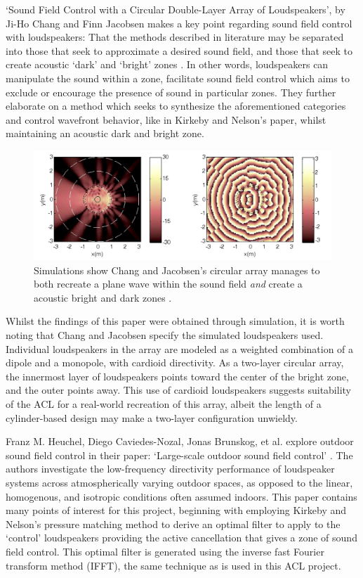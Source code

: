 \documentclass{report}
\begin{document}
        `Sound Field Control with a Circular Double-Layer Array of Loudspeakers', by Ji-Ho Chang and Finn Jacobsen makes a key point regarding sound field control with loudspeakers: That the methods described in literature may be separated into those that seek to approximate a desired sound field, and those that seek to create acoustic `dark' and `bright' zones \cite{chang2012sound}.
        In other words, loudspeakers can manipulate the sound within a zone, facilitate sound field control which aims to exclude or encourage the presence of sound in particular zones.
        They further elaborate on a method which seeks to synthesize the aforementioned categories and control wavefront behavior, like in Kirkeby and Nelson's paper, whilst maintaining an acoustic dark and bright zone.

        \begin{figure}[H]
            \centering
            \includegraphics[width = 0.6\linewidth]{figs/changField.png}
            \caption{Simulations show Chang and Jacobsen's circular array manages to both recreate a plane wave within the sound field \textit{and} create a acoustic bright and dark zones \cite{chang2012sound}.}
            \label{changField}
        \end{figure}

        Whilst the findings of this paper were obtained through simulation, it is worth noting that Chang and Jacobsen specify the simulated loudspeakers used.
        Individual loudspeakers in the array are modeled as a weighted combination of a dipole and a monopole, with cardioid directivity.
        As a two-layer circular array, the innermost layer of loudspeakers points toward the center of the bright zone, and the outer points away.
        This use of cardioid loudspeakers suggests suitability of the ACL for a real-world recreation of this array, albeit the length of a cylinder-based design may make a two-layer configuration unwieldy.

        Franz M. Heuchel, Diego Caviedes-Nozal, Jonas Brunskog, et al. explore outdoor sound field control in their paper: `Large-scale outdoor sound field control' \cite{heuchel2020large}.
        The authors investigate the low-frequency directivity performance of loudspeaker systems across atmospherically varying outdoor spaces, as opposed to the linear, homogenous, and isotropic conditions often assumed indoors.
        This paper contains many points of interest for this project, beginning with employing Kirkeby and Nelson's pressure matching method \cite{kirkeby1993reproduction} to derive an optimal filter to apply to the `control' loudspeakers providing the active cancellation that gives a zone of sound field control.
        This optimal filter is generated using the inverse fast Fourier transform method (IFFT), the same technique as is used in this ACL project.
        
\end{document}
